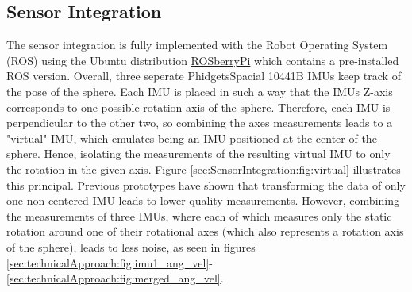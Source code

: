 \subsection{Sensor Integration}
\label{sec:TechnicalApproach:sensorintegration}

The sensor integration is fully implemented with the Robot Operating System (ROS) using the Ubuntu distribution \href{http://wiki.ros.org/ROSberryPi}{ROSberryPi} which contains a pre-installed ROS version.
Overall, three seperate PhidgetsSpacial 10441B IMUs \cite{imuphidgets} keep track of the pose of the sphere. Each IMU is placed in such a way that the IMUs Z-axis corresponds to one possible rotation axis of the sphere.
Therefore, each IMU is perpendicular to the other two, so combining the axes measurements leads to a "virtual" IMU, which emulates being an IMU positioned at the center of the sphere. 
Hence, isolating the measurements of the resulting virtual IMU to only the rotation in the given axis.
Figure \ref{sec:SensorIntegration:fig:virtual} illustrates this principal.
Previous prototypes have shown that transforming the data of only one non-centered IMU leads to lower quality measurements.
However, combining the measurements of three IMUs, where each of which measures only the static rotation around one of their rotational axes (which also represents a rotation axis of the sphere), leads to less noise, as seen in figures  \ref{sec:technicalApproach:fig:imu1_ang_vel}-\ref{sec:technicalApproach:fig:merged_ang_vel}.

